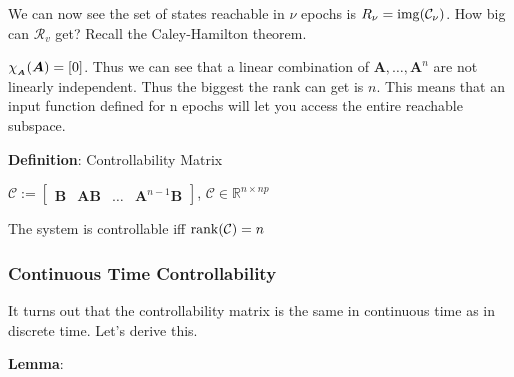 \documentclass[11pt]{article}
\begin{document}
  \vspace{12pt}

  We can now see the set of states reachable in \(\nu\) epochs is \(R_{\nu} = \mathrm{img}{\left( \mathcal{C}_{\nu} \right)}\).
  How big can \(\mathcal{R}_v\) get? Recall the Caley-Hamilton theorem.

  \(\chi_{_{\bm{A}}}(\bm{A}) = [0]\). Thus we can see that a linear combination of \(\bm{A}, \dots, \bm{A}^n\) are
  not linearly independent. Thus the biggest the rank can get is \(n\). This means that
  an input function defined for n epochs will let you access the entire reachable subspace.

  \vspace{12pt}

  \textbf{Definition}: Controllability Matrix

  \(\mathcal{C} := \begin{bmatrix} \bm{B} & \bm{AB} & \dots & \bm{A}^{n - 1}\bm{B}\end{bmatrix}\),
  \(\mathcal{C} \in \mathbb{R}^{n \times np}\)

  The system is controllable iff \(\rank(\mathcal{C}) = n\)

  \pagebreak

  \subsubsection{Continuous Time Controllability}

  It turns out that the controllability matrix is the same in continuous time as in discrete time.
  Let's derive this.

  \textbf{Lemma}:
\end{document}
